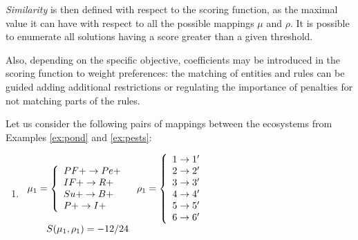 \documentclass[a4paper,twoside]{article}
\begin{document}
\emph{Similarity} is then defined with respect to the scoring function, as the maximal value it can have with respect to all the possible mappings $\mu$ and $\rho$.
It is possible to enumerate all solutions having a score greater than a given threshold. 

Also, depending on the specific objective, coefficients may be introduced in the scoring  function to weight preferences:  the matching of entities and  rules can be guided adding additional  restrictions or regulating the importance of penalties for not matching parts of the rules.  


\begin{example}[Similarity] \label{ex:similarity}
Let us consider the following pairs of mappings between the ecosystems from Examples \ref{ex:pond} and \ref{ex:pests}:
\begin{enumerate}
\item $\begin{array}{l@{\hspace{3mm}}l@{\hspace{3mm}}}
	\mapcomp_1=\left\{
				\begin{array}{l}
					PF+ \to Pe+ \\
                    IF+ \to R+ \\
                    Su+ \to B+\\
                    P+ \to I+\\
				\end{array}\right.
                    &
     \maprule_1=\left\{
                \begin{array}{l}
					1 \to 1' \\
                    2 \to 2' \\
					3 \to 3' \\
                    4 \to 4' \\
					5 \to 5' \\
                    6 \to 6' \\
					\end{array}\right. 
                    \\
  \qquad \gf(\mapcomp_1,\maprule_1)=-12/24
     \end{array}$
              


\end{enumerate}
\end{example}
\end{document}
